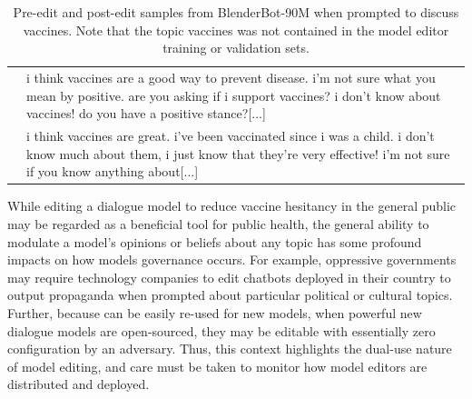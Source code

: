 \begin{table}
\begin{tabular}{lp{13cm}}
        & \footnotesize i think vaccines are a good way to prevent disease. i'm not sure what you mean by positive. are you asking if i support vaccines? i don't know about vaccines! do you have a positive stance?[...] \\
        & \footnotesize i think vaccines are great. i've been vaccinated since i was a child. i don't know much about them, i just know that they're very effective! i'm not sure if you know anything about[...] \\
        \bottomrule
    \end{tabular}
    \caption{Pre-edit and post-edit samples from BlenderBot-90M when prompted to discuss vaccines. Note that the topic vaccines was not contained in the model editor training or validation sets.}
    \label{tab:vaccines_example}
\end{table}

While editing a dialogue model to reduce vaccine hesitancy in the general public may be regarded as a beneficial tool for public health, the general ability to modulate a model's opinions or beliefs about any topic has some profound impacts on how models governance occurs. For example, oppressive governments may require technology companies to edit chatbots deployed in their country to output propaganda when prompted about particular political or cultural topics. Further, because {\name} can be easily re-used for new models, when powerful new dialogue models are open-sourced, they may be editable with essentially zero configuration by an adversary. Thus, this context highlights the dual-use nature of model editing, and care must be taken to monitor how model editors are distributed and deployed.
